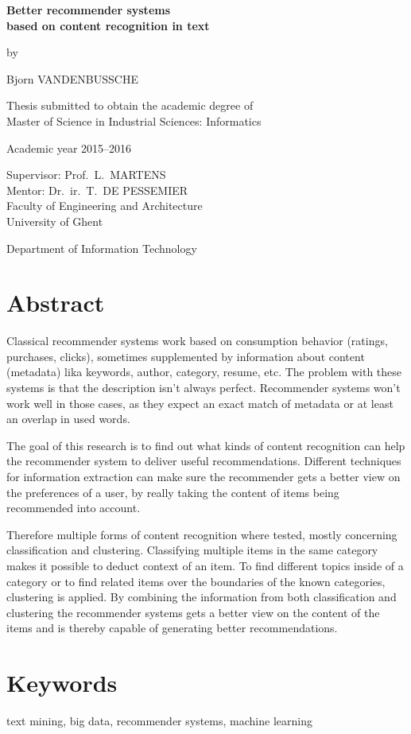 {
\setlength{\baselineskip}{14pt}
\setlength{\parindent}{0pt}
\setlength{\parskip}{8pt}

\begin{center}

\noindent \textbf{\huge
Better recommender systems\\[8pt]based on content recognition in text
}

by 

Bjorn VANDENBUSSCHE

Thesis submitted to obtain the academic degree of\\
Master of Science in Industrial Sciences: Informatics

Academic year 2015--2016

Supervisor: Prof.~L.~MARTENS\\
Mentor: Dr.~ir.~T.~DE PESSEMIER\\

Faculty of Engineering and Architecture\\
University of Ghent

Department of Information Technology

\end{center}

\section*{Abstract}

Classical recommender systems work based on consumption behavior (ratings, purchases, clicks), sometimes supplemented by information about content (metadata) lika keywords, author, category, resume, etc. The problem with these systems is that the description isn't always perfect. Recommender systems won't work well in those cases, as they expect an exact match of metadata or at least an overlap in used words.

The goal of this research is to find out what kinds of content recognition can help the recommender system to deliver useful recommendations. Different techniques for information extraction can make sure the recommender gets a better view on the preferences of a user, by really taking the content of items being recommended into account.

Therefore multiple forms of content recognition where tested, mostly concerning classification and clustering. Classifying multiple items in the same category makes it possible to deduct context of an item. To find different topics inside of a category or to find related items over the boundaries of the known categories, clustering is applied. By combining the information from both classification and clustering the recommender systems gets a better view on the content of the items and is thereby capable of generating better recommendations.

\section*{Keywords}

text mining, big data, recommender systems, machine learning

}

\newpage %
